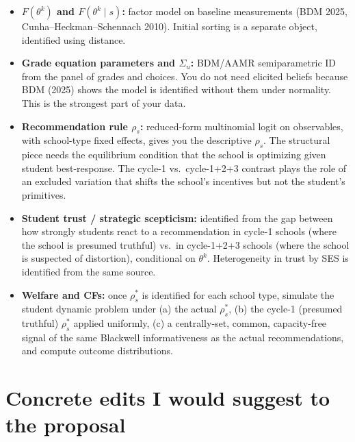\documentclass{article}
\begin{document}
\begin{itemize}[leftmargin=*]
  \item \textbf{$F(\theta^k)$ and $F(\theta^k\mid s)$:} factor model on
  baseline measurements (BDM 2025, Cunha--Heckman--Schennach 2010).
  Initial sorting is a separate object, identified using distance.

  \item \textbf{Grade equation parameters and $\Sigma_u$:} BDM/AAMR semiparametric ID
  from the panel of grades and choices. You do not need elicited beliefs
  because BDM (2025) shows the model is identified without them under
  normality. This is the strongest part of your data.

  \item \textbf{Recommendation rule $\rho_s$:} reduced-form multinomial logit
  on observables, with school-type fixed effects, gives you the descriptive
  $\rho_s$. The structural piece needs the equilibrium condition that the
  school is optimizing given student best-response. The cycle-1 vs.\
  cycle-1+2+3 contrast plays the role of an excluded variation that shifts
  the school's incentives but not the student's primitives.

  \item \textbf{Student trust / strategic scepticism:} identified from
  the gap between how strongly students react to a recommendation in
  cycle-1 schools (where the school is presumed truthful) vs.\ in
  cycle-1+2+3 schools (where the school is suspected of distortion),
  conditional on $\theta^k$. Heterogeneity in trust by SES is identified
  from the same source.

  \item \textbf{Welfare and CFs:} once $\rho_s^*$ is identified for each
  school type, simulate the student dynamic problem under (a) the actual
  $\rho_s^*$, (b) the cycle-1 (presumed truthful) $\rho_s^*$ applied
  uniformly, (c) a centrally-set, common, capacity-free signal of the same
  Blackwell informativeness as the actual recommendations, and compute
  outcome distributions.
\end{itemize}

\section{Concrete edits I would suggest to the proposal}
\end{document}

